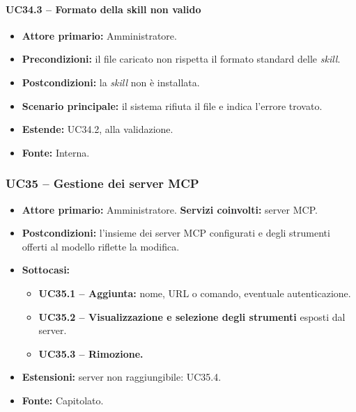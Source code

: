 \documentclass[12pt,a4paper]{article}
\newcommand{\tightlist}{\setlength{\itemsep}{1pt}\setlength{\parskip}{0pt}}
\begin{document}
\paragraph{UC34.3 -- Formato della skill non valido}

\begin{itemize}

\tightlist

\item \textbf{Attore primario:} Amministratore.

\item \textbf{Precondizioni:} il file caricato non rispetta il formato standard delle \emph{skill}.

\item \textbf{Postcondizioni:} la \emph{skill} non è installata.

\item \textbf{Scenario principale:} il sistema rifiuta il file e indica l'errore trovato.

\item \textbf{Estende:} UC34.2, alla validazione.

\item \textbf{Fonte:} Interna.

\end{itemize}



\subsubsection{UC35 -- Gestione dei server MCP}

\begin{itemize}

\tightlist

\item \textbf{Attore primario:} Amministratore. \textbf{Servizi coinvolti:} server MCP.

\item \textbf{Postcondizioni:} l'insieme dei server MCP configurati e degli strumenti offerti al modello riflette la modifica.

\item \textbf{Sottocasi:}

\begin{itemize}

\tightlist

\item \textbf{UC35.1 -- Aggiunta:} nome, URL o comando, eventuale autenticazione.

\item \textbf{UC35.2 -- Visualizzazione e selezione degli strumenti} esposti dal server.

\item \textbf{UC35.3 -- Rimozione.}

\end{itemize}

\item \textbf{Estensioni:} server non raggiungibile: UC35.4.

\item \textbf{Fonte:} Capitolato.

\end{itemize}
\end{document}
